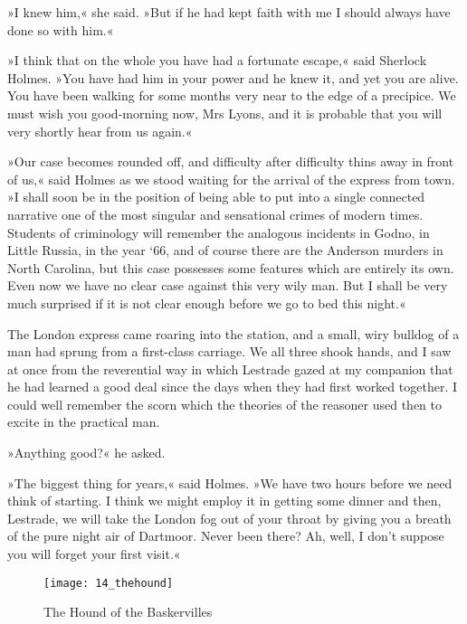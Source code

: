 »I knew him,« she said. »But if he had kept faith with me I should always have done so with him.«

»I think that on the whole you have had a fortunate escape,« said Sherlock Holmes. »You have had him in your power and he knew it, and yet you are alive. You have been walking for some months very near to the edge of a precipice. We must wish you good-morning now, Mrs Lyons, and it is probable that you will very shortly hear from us again.«

»Our case becomes rounded off, and difficulty after difficulty thins away in front of us,« said Holmes as we stood waiting for the arrival of the express from town. »I shall soon be in the position of being able to put into a single connected narrative one of the most singular and sensational crimes of modern times. Students of criminology will remember the analogous incidents in Godno, in Little Russia, in the year `66, and of course there are the Anderson murders in North Carolina, but this case possesses some features which are entirely its own. Even now we have no clear case against this very wily man. But I shall be very much surprised if it is not clear enough before we go to bed this night.«

The London express came roaring into the station, and a small, wiry bulldog of a man had sprung from a first-class carriage. We all three shook hands, and I saw at once from the reverential way in which Lestrade gazed at my companion that he had learned a good deal since the days when they had first worked together. I could well remember the scorn which the theories of the reasoner used then to excite in the practical man.

»Anything good?« he asked.

»The biggest thing for years,« said Holmes. »We have two hours before we need think of starting. I think we might employ it in getting some dinner and then, Lestrade, we will take the London fog out of your throat by giving you a breath of the pure night air of Dartmoor. Never been there? Ah, well, I don't suppose you will forget your first visit.«
\clearpage
\vfill
\begin{figure}[tbph]
\centering
\texttt{[image: 14\_thehound]}
\caption{The Hound of the Baskervilles}
\end{figure}
\vfill
\thispagestyle{empty}
\clearpage